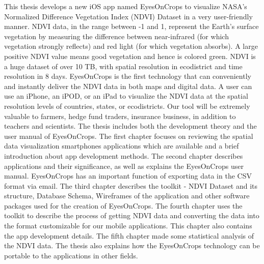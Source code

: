 
This thesis develops a new iOS app named EyesOnCrops to visualize NASA's Normalized Difference Vegetation Index (NDVI) Dataset in a very user-friendly manner. NDVI data, in the range between -1 and 1, represent the Earth’s surface vegetation by measuring the difference between near-infrared (for which vegetation strongly reflects) and red light (for which vegetation absorbs). A large positive NDVI value means good vegetation and hence is colored green. NDVI is a huge dataset of over 10 TB, with spatial resolution in ecodistrict and time resolution in 8 days. EyesOnCrops is the first technology that can conveniently and instantly deliver the NDVI data in both maps and digital data. A user can use an iPhone, an iPOD, or an iPad to visualize the NDVI data at the spatial resolution levels of countries, states, or ecodistricts. Our tool will be extremely valuable to farmers, hedge fund traders, insurance business, in addition to teachers and scientists. The thesis includes both the development theory and the user manual of EyesOnCrops. The first chapter focuses on reviewing the spatial data visualization smartphones applications which are available and a brief introduction about app development methods. The second chapter describes applications and their significance, as well as explains the EyesOnCrops user manual. EyesOnCrops has an important function of exporting data in the CSV format via email. The third chapter describes the toolkit - NDVI Dataset and its structure, Database Schema, Wireframes of the application and other software packages used for the creation of EyesOnCrops. The fourth chapter uses the toolkit to describe the process of getting NDVI data and converting the data into the format customizable for our mobile applications. This chapter also contains the app development details. The fifth chapter made some statistical analysis of the NDVI data. The thesis also explains how the EyesOnCrops technology can be portable to the applications in other fields.


